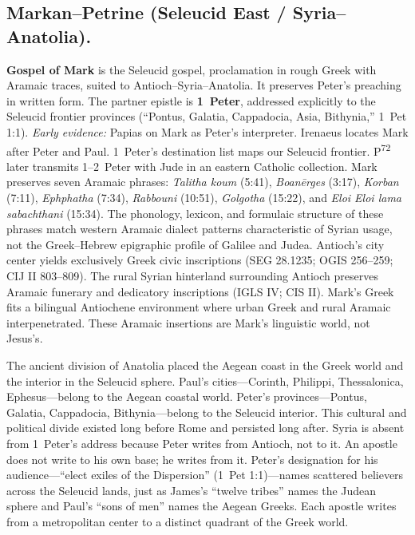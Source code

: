 \subsection{Markan--Petrine (Seleucid East / Syria--Anatolia).}
\textbf{Gospel of Mark} is the Seleucid gospel, proclamation in rough Greek with Aramaic traces, suited to Antioch--Syria--Anatolia.
It preserves Peter’s preaching in written form.
The partner epistle is \textbf{1~Peter}, addressed explicitly to the Seleucid frontier provinces (“Pontus, Galatia, Cappadocia, Asia, Bithynia,” 1~Pet 1:1).
\emph{Early evidence:} Papias on Mark as Peter’s interpreter.
Irenaeus locates Mark after Peter and Paul.
1~Peter’s destination list maps our Seleucid frontier.
P\textsuperscript{72} later transmits 1--2~Peter with Jude in an eastern Catholic collection.
Mark preserves seven Aramaic phrases: \textit{Talitha koum} (5:41), \textit{Boanērges} (3:17), \textit{Korban} (7:11), \textit{Ephphatha} (7:34), \textit{Rabbouni} (10:51), \textit{Golgotha} (15:22), and \textit{Eloi Eloi lama sabachthani} (15:34).
The phonology, lexicon, and formulaic structure of these phrases match western Aramaic dialect patterns characteristic of Syrian usage, not the Greek--Hebrew epigraphic profile of Galilee and Judea.
Antioch's city center yields exclusively Greek civic inscriptions (SEG 28.1235; OGIS 256--259; CIJ II 803--809).
The rural Syrian hinterland surrounding Antioch preserves Aramaic funerary and dedicatory inscriptions (IGLS IV; CIS II).
Mark's Greek fits a bilingual Antiochene environment where urban Greek and rural Aramaic interpenetrated.
These Aramaic insertions are Mark's linguistic world, not Jesus's.

The ancient division of Anatolia placed the Aegean coast in the Greek world and the interior in the Seleucid sphere.
Paul's cities---Corinth, Philippi, Thessalonica, Ephesus---belong to the Aegean coastal world.
Peter's provinces---Pontus, Galatia, Cappadocia, Bithynia---belong to the Seleucid interior.
This cultural and political divide existed long before Rome and persisted long after.
Syria is absent from 1~Peter's address because Peter writes from Antioch, not to it.
An apostle does not write to his own base; he writes from it.
Peter's designation for his audience---``elect exiles of the Dispersion'' (1~Pet 1:1)---names scattered believers across the Seleucid lands, just as James's ``twelve tribes'' names the Judean sphere and Paul's ``sons of men'' names the Aegean Greeks.
Each apostle writes from a metropolitan center to a distinct quadrant of the Greek world.

